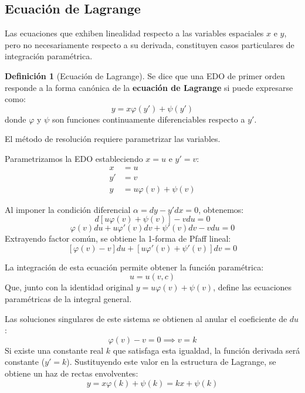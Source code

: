 \documentclass[11pt,a4paper]{article}
\theoremstyle{definition}
\newtheorem{definition}{Definición}[section]
\theoremstyle{plain}
\begin{document}
\subsection{Ecuación de Lagrange}

Las ecuaciones que exhiben linealidad respecto a las variables espaciales $x$ e $y$, pero no necesariamente respecto a su derivada, constituyen casos particulares de integración paramétrica.

\begin{definition}[Ecuación de Lagrange]
Se dice que una EDO de primer orden responde a la forma canónica de la \textbf{ecuación de Lagrange} si puede expresarse como:
$$ y = x \varphi(y') + \psi(y') $$
donde $\varphi$ y $\psi$ son funciones continuamente diferenciables respecto a $y'$.
\end{definition}

El método de resolución requiere parametrizar las variables. 

\begin{tcolorbox}[
    enhanced, breakable,
    colback=blue!2!white, colframe=blue!50!black,
    boxrule=0.8pt, arc=4pt, left=12pt, right=12pt, top=10pt, bottom=10pt,
    title=\textbf{Resolución paramétrica de la ecuación de Lagrange},
    coltitle=white, fonttitle=\bfseries,
    drop fuzzy shadow=gray!15
]
Parametrizamos la EDO estableciendo $x = u$ e $y' = v$:
\begin{align*}
    x &= u \\
    y' &= v \\
    y &= u \varphi(v) + \psi(v)
\end{align*}

Al imponer la condición diferencial $\alpha = dy - y'dx = 0$, obtenemos:
$$ d[u \varphi(v) + \psi(v)] - v du = 0 $$
$$ \varphi(v)du + u \varphi'(v)dv + \psi'(v)dv - v du = 0 $$
Extrayendo factor común, se obtiene la 1-forma de Pfaff lineal:
$$
    [\varphi(v) - v]du + [u \varphi'(v) + \psi'(v)]dv = 0
$$

La integración de esta ecuación permite obtener la función paramétrica:
$$
    u = u(v, c)
$$
Que, junto con la identidad original $y = u \varphi(v) + \psi(v)$, define las ecuaciones paramétricas de la integral general.

Las soluciones singulares de este sistema se obtienen al anular el coeficiente de $du$:
$$ \varphi(v) - v = 0 \implies v = k $$
Si existe una constante real $k$ que satisfaga esta igualdad, la función derivada será constante ($y' = k$). Sustituyendo este valor en la estructura de Lagrange, se obtiene un haz de rectas envolventes:
$$ y = x \varphi(k) + \psi(k) = kx + \psi(k) $$
\end{tcolorbox}
\end{document}
